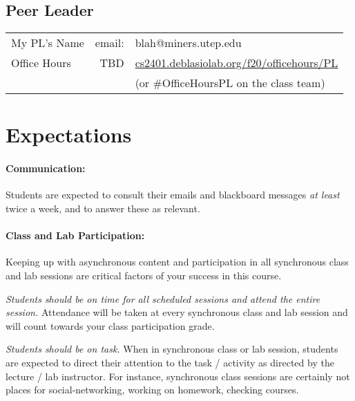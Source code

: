 \documentclass[12pt]{scrartcl}
\newcommand{\change}[2]{#2}
\begin{document}
\subsection{Peer Leader}

\begin{tabular}{lrl}
\color{red}My PL's Name  
 & email: & blah@miners.utep.edu\\
\hspace{2em} Office Hours& TBD & \url{cs2401.deblasiolab.org/f20/officehours/PL}\\
& & (or \#OfficeHoursPL on the class team)\\
\end{tabular}

\section{Expectations}

\paragraph{Communication:} Students are expected to consult their emails and blackboard messages \textit{at least} twice a week, and to answer these as relevant. 

\paragraph{Class and Lab Participation:} \change{Attendance }{Keeping up with asynchronous content} and participation in all \change{lecture}{synchronous class} and lab sessions are critical factors of your success in this course. 

\textit{Students should be on time for all scheduled sessions and attend the entire session.} 
Attendance will be taken at every \change{}{synchronous class and lab} session \change{(at first you will have to sign in but as time goes the instructor will know you and mark you present without your help)} and will count towards your class participation grade. 

\textit{Students should be on task.} 
When in \change{lecture}{synchronous class} or lab session, students are expected to direct their attention to the task / activity as directed by the lecture / lab instructor. 
For instance, \change{lecture and lab}{synchronous class} sessions are certainly not places for social-networking, working on homework, checking courses.
\end{document}
